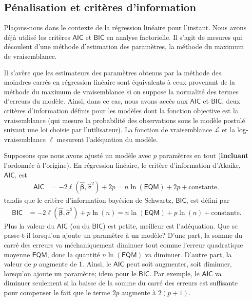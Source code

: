 \documentclass[
  11pt,
  letterpaper,
]{scrbook}
\theoremstyle{definition}
\theoremstyle{remark}
\begin{document}
\subsection{Pénalisation et critères
d'information}\label{puxe9nalisation-et-crituxe8res-dinformation}

Plaçons-nous dans le contexte de la régression linéaire pour l'instant.
Nous avons déjà utilisé les critères \(\mathsf{AIC}\) et
\(\mathsf{BIC}\) en analyse factorielle. Il s'agit de mesures qui
découlent d'une méthode d'estimation des paramètres, la méthode du
maximum de vraisemblance.

Il s'avère que les estimateurs des paramètres obtenus par la méthode des
moindres carrés en régression linéaire sont équivalents à ceux provenant
de la méthode du maximum de vraisemblance si on suppose la normalité des
termes d'erreurs du modèle. Ainsi, dans ce cas, nous avons accès aux
\(\mathsf{AIC}\) et \(\mathsf{BIC}\), deux critères d'information
définis pour les modèles dont la fonction objective est la vraisemblance
(qui mesure la probabilité des observations sous le modèle postulé
suivant une loi choisie par l'utilisateur). La fonction de vraisemblance
\(\mathcal{L}\) et la log-vraisemblance \(\ell\) mesurent l'adéquation
du modèle.

Supposons que nous avons ajusté un modèle avec \(p\) paramètres en tout
(\textbf{incluant} l'ordonnée à l'origine). En régression linéaire, le
critère d'information d'Akaike, \(\mathsf{AIC}\), est \begin{align*}
\mathsf{AIC} &=-2 \ell(\widehat{\boldsymbol{\beta}}, \widehat{\sigma}^2) +2p = n \ln (\mathsf{EQM}) + 2p + \text{constante},
\end{align*} tandis que le critère d'information bayésien de Schwartz,
\(\mathsf{BIC}\), est défini par \begin{align*}
\mathsf{BIC} &=-2 \ell(\widehat{\boldsymbol{\beta}}, \widehat{\sigma}^2) + p\ln(n)=n \ln (\mathsf{EQM}) + p\ln(n) + \text{constante}.
\end{align*} Plus la valeur du \(\mathsf{AIC}\) (ou du \(\mathsf{BIC}\))
est petite, meilleur est l'adéquation. Que se passe-t-il lorsqu'on
ajoute un paramètre à un modèle? D'une part, la somme du carré des
erreurs va méchaniquement diminuer tout comme l'erreur quadratique
moyenne \(\textsf{EQM}\), donc la quantité \(n \ln (\mathsf{EQM})\) va
diminuer. D'autre part, la valeur de \(p\) augmente de \(1\). Ainsi, le
\(\mathsf{AIC}\) peut soit augmenter, soit diminuer, lorsqu'on ajoute un
paramètre; idem pour le \(\mathsf{BIC}\). Par exemple, le
\(\mathsf{AIC}\) va diminuer seulement si la baisse de la somme du carré
des erreurs est suffisante pour compenser le fait que le terme \(2p\)
augmente à \(2 (p+1)\).
\end{document}
